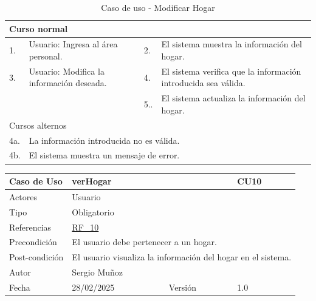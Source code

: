 \begin{table}[H]
    \centering
    \begin{tabular}{| m{} | m{} | m{} | m{} |}
        \hline
        \multicolumn{4}{|m{0.9\textwidth}|}{Curso normal} \\ 
        \hline
        1. & Usuario: Ingresa al área personal. 
        & 2. & El sistema muestra la información del hogar. \\ 
        \hline
        3. & Usuario: Modifica la información deseada. 
        & 4. & El sistema verifica que la información introducida sea válida. \\ 
        \hline
        &
        & 5.. & El sistema actualiza la información del hogar. \\ 
        \hline
        \multicolumn{4}{|m{0.9\textwidth}|}{Cursos alternos} \\ 
        \hline 
        4a. & \multicolumn{3}{l|}{La información introducida no es válida.} \\ 
        \hline
        4b. & \multicolumn{3}{l|}{El sistema muestra un mensaje de error.} \\ 
        \hline
    \end{tabular}
    \caption{Caso de uso - Modificar Hogar}
\end{table}

\newpage

\begin{table}[H]
    \centering
    \begin{tabular}{| m{} | m{} | m{} | m{} |}
        \hline
        \rowcolor[HTML]{C0C0C0} Caso de Uso & \multicolumn{2}{|m{0.43\textwidth}|}{verHogar} &  CU10\\ 
        \hline
        Actores & \multicolumn{3}{l|}{Usuario} \\ 
        \hline
        Tipo & \multicolumn{3}{l|}{Obligatorio} \\ 
        \hline
        Referencias & \multicolumn{3}{l|}{\hyperref[req:RF10]{RF\_10}} \\ 
        \hline
        Precondición & \multicolumn{3}{m{0.67\textwidth}|}{El usuario debe pertenecer a un hogar.} \\ 
        \hline
        Post-condición & \multicolumn{3}{m{0.67\textwidth}|}{El usuario visualiza la información del hogar en el sistema.} \\ 
        \hline
        Autor & \multicolumn{3}{l|}{Sergio Muñoz} \\ 
        \hline
        Fecha & 28/02/2025 & Versión & 1.0 \\ 
        \hline
    \end{tabular}
\end{table}

